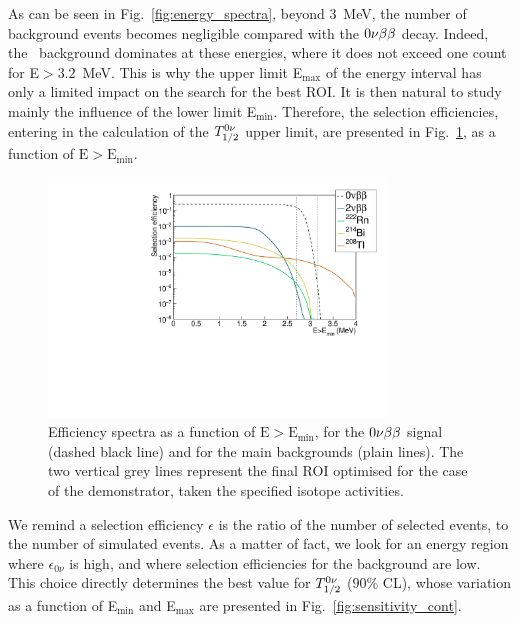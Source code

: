 As can be seen in Fig.~\ref{fig:energy_spectra}, beyond $3$~MeV, the number of background events becomes negligible compared with the $0\nu\beta\beta$ decay.
Indeed, the \Tl\ background dominates at these energies, where it does not exceed one count for E$>3.2$~MeV.
This is why the upper limit E$_{\text{max}}$ of the energy interval has only a limited impact on the search for the best ROI.
It is then natural to study mainly the influence of the lower limit E$_{\text{min}}$.
Therefore, the selection efficiencies, entering in the calculation of the $T_{1/2}^{0\nu}$ upper limit, are presented in Fig.~\ref{fig:efficiency_spectra}, as a function of $\text{E}>\text{E}_{\text{min}}$.
\begin{figure}[h]
  \centering
  \includegraphics[width=0.8\textwidth]{Sensitivity/fig_sensitivity/efficiency_spectrum_with_B_82Se.pdf}
  \caption{Efficiency spectra as a function of $\text{E}>\text{E}_{\text{min}}$, for the $0\nu\beta\beta$ signal (dashed black line) and for the main backgrounds (plain lines).
    The two vertical grey lines represent the final ROI optimised for the case of the demonstrator, taken the specified isotope activities.
    \label{fig:efficiency_spectra}}
\end{figure}
We remind a selection efficiency $\epsilon$ is the ratio of the number of selected events, to the number of simulated events.
As a matter of fact, we look for an energy region where $\epsilon_{0\nu}$ is high, and where selection efficiencies for the background are low.
This choice directly determines the best value for $T_{1/2}^{0\nu}$ ($90\%$ CL), whose variation as a function of E$_{\text{min}}$ and E$_{\text{max}}$ are presented in Fig.~\ref{fig:sensitivity_cont}.
